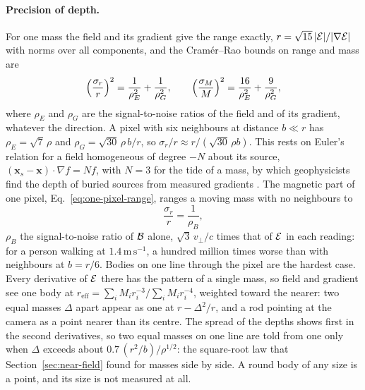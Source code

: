 \paragraph{Precision of depth.} For one mass the field and its gradient
give the range exactly, $r = \sqrt{15}\,|\mathcal{E}|/|\nabla\mathcal{E}|$ with norms over all
components, and the Cram\'er--Rao bounds on range and mass are
\begin{equation}\label{eq:depth-bound}
\Bigl(\frac{\sigma_r}{r}\Bigr)^2 = \frac{1}{\rho_E^2} + \frac{1}{\rho_G^2},
\qquad
\Bigl(\frac{\sigma_M}{M}\Bigr)^2 = \frac{16}{\rho_E^2} + \frac{9}{\rho_G^2},
\end{equation}
where $\rho_E$ and $\rho_G$ are the signal-to-noise ratios of the field and of
its gradient, whatever the direction. A pixel with six neighbours at distance
$b \ll r$ has $\rho_E = \sqrt7\,\rho$ and $\rho_G = \sqrt{30}\,\rho\,b/r$, so
$\sigma_r/r \approx r/(\sqrt{30}\,\rho b)$. This rests on Euler's relation for a
field homogeneous of degree $-N$ about its source, $(\mathbf{x}_s -
\mathbf{x})\cdot\nabla f = N f$, with $N = 3$ for the tide of a mass, by which
geophysicists find the depth of buried sources from measured gradients
\cite{Thompson1982,Reid1990}. The magnetic part of one pixel,
Eq.~\eqref{eq:one-pixel-range}, ranges a moving mass with no neighbours to
\begin{equation}\label{eq:magnetic-range}
\frac{\sigma_r}{r} = \frac{1}{\rho_B} ,
\end{equation}
$\rho_B$ the signal-to-noise ratio of $\mathcal{B}$ alone, $\sqrt3\,v_\perp/c$ times
that of $\mathcal{E}$ in each reading: for a person walking at
$1.4\,\mathrm{m\,s^{-1}}$, a hundred million times worse than with neighbours
at $b = r/6$.
Bodies on one line through the pixel are the hardest case. Every derivative of
$\mathcal{E}$ there has the pattern of a single mass, so field and
gradient see one body at $r_{\mathrm{eff}} = \sum_i M_i r_i^{-3} / \sum_i M_i
r_i^{-4}$, weighted toward the nearer: two equal masses $\Delta$ apart appear
as one at $r - \Delta^2/r$, and a rod pointing at the camera as a point nearer
than its centre. The spread of the depths shows first in the second
derivatives, so two equal masses on one line are told from one only when
$\Delta$ exceeds about $0.7\,(r^2/b)/\rho^{1/2}$: the square-root law that
Section~\ref{sec:near-field} found for masses side by side. A round body of any
size is a point, and its size is not measured at all.

